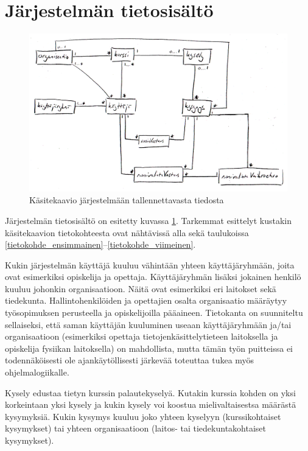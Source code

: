 \documentclass[12pt,a4paper,titlepage]{article}
\begin{document}
\section{Järjestelmän tietosisältö}
\begin{figure}
   \centering
   \includegraphics[width=\textwidth]{kuvat/kasitekaavio.png}
   \caption{Käsitekaavio järjestelmään tallennettavasta tiedosta}\label{fig:kasitekaavio}
\end{figure}

Järjestelmän tietosisältö on esitetty kuvassa \ref{fig:kasitekaavio}. Tarkemmat esittelyt kustakin käsitekaavion tietokohteesta ovat nähtävissä alla sekä taulukoissa \ref{tietokohde_ensimmainen}--\ref{tietokohde_viimeinen}.

Kukin järjestelmän käyttäjä kuuluu vähintään yhteen käyttäjäryhmään, joita ovat esimerkiksi opiskelija ja opettaja. Käyttäjäryhmän lisäksi jokainen henkilö kuuluu johonkin organisaatioon. Näitä ovat esimerkiksi eri laitokset sekä tiedekunta. Hallintohenkilöiden ja opettajien osalta organisaatio määräytyy työsopimuksen perusteella ja opiskelijoilla pääaineen. Tietokanta on suunniteltu sellaiseksi, että saman käyttäjän kuuluminen useaan käyttäjäryhmään ja/tai organisaatioon (esimerkiksi opettaja tietojenkäsittelytieteen laitoksella ja opiskelija fysiikan laitoksella) on mahdollista, mutta tämän työn puitteissa ei todennäköisesti ole ajankäytöllisesti järkevää toteuttaa tukea myös ohjelmalogiikalle.

Kysely edustaa tietyn kurssin palautekyselyä. Kutakin kurssia kohden on yksi korkeintaan yksi kysely ja kukin kysely voi koostua mielivaltaisestsa määrästä kysymyksiä. Kukin kysymys kuuluu joko yhteen kyselyyn (kurssikohtaiset kysymykset) tai yhteen organisaatioon (laitos- tai tiedekuntakohtaiset kysymykset).
\end{document}
